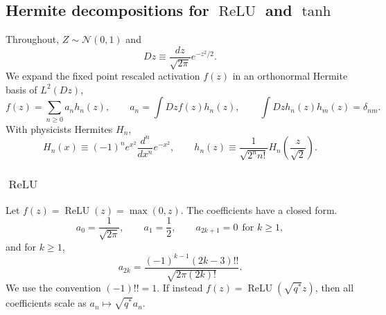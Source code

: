\documentclass{article}
\DeclareMathOperator{\ReLU}{ReLU}
\newcommand{\relu}{\ensuremath{\ReLU}}
\theoremstyle{plain}
\theoremstyle{definition}
\theoremstyle{remark}
\begin{document}
\newpage










\subsection{Hermite decompositions for \relu{} and \texorpdfstring{\(\tanh\)}{tanh}}

Throughout, \(Z\sim\mathcal{N}(0,1)\) and
\relax
\begin{equation}
Dz \equiv \frac{dz}{\sqrt{2\pi}}e^{-z^{2}/2}.
\end{equation}
\relax
We expand the fixed point rescaled activation \(f(z)\) in an orthonormal Hermite basis of \(L^{2}(Dz)\),
\relax
\begin{equation}
f(z)=\sum_{n\ge 0} a_{n} h_{n}(z), \qquad a_{n}=\int Dz f(z) h_{n}(z), \qquad \int Dz h_{n}(z)h_{m}(z)=\delta_{nm}.
\end{equation}
\relax
With physicists Hermites \(H_{n}\),
\relax
\begin{equation}
H_{n}(x)\equiv (-1)^{n}e^{x^{2}}\frac{d^{n}}{dx^{n}}e^{-x^{2}}, \qquad h_{n}(z)\equiv \frac{1}{\sqrt{2^{n}n!}} H_{n}\left(\frac{z}{\sqrt{2}}\right).
\end{equation}
\relax









\subsubsection{\relu{}}

Let \(f(z)=\ReLU(z)=\max(0,z)\). The coefficients have a closed form.
\relax
\begin{equation}
a_{0}=\frac{1}{\sqrt{2\pi}}, \qquad a_{1}=\frac{1}{2}, \qquad a_{2k+1}=0 \ \ \text{for } k\ge 1,
\end{equation}
\relax
and for \(k\ge 1\),
\relax
\begin{equation}
a_{2k} = \frac{(-1)^{k-1}(2k-3)!!}{\sqrt{2\pi(2k)!}}.
\end{equation}
\relax
We use the convention \((-1)!!=1\). If instead \(f(z)=\ReLU(\sqrt{q^{*}} z)\), then all coefficients scale as \(a_{n}\mapsto \sqrt{q^{*}} a_{n}\).
\end{document}
